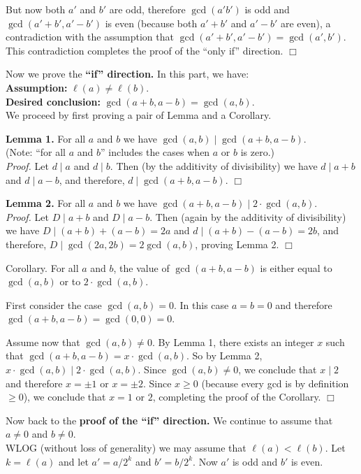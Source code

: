 \documentclass{amsart}
\begin{document}
\medskip\noindent
But now both $a'$ and $b'$ are odd, therefore $\gcd(a'b')$
is odd and $\gcd(a'+b',a'-b')$ is even (because both
$a'+b'$ and $a'-b'$ are even), a contradiction
with the assumption that $\gcd(a'+b',a'-b')=\gcd(a',b')$.
This contradiction completes  the proof of the ``only if''
direction.   \hfill $\Box$

\medskip\noindent
Now we prove the {\bf ``if'' direction.}
In this part, we have:\\
{\bf Assumption:} $\ell(a)\neq \ell(b)$.\\
{\bf Desired conclusion:} \quad $\gcd(a+b,a-b)=\gcd(a,b)$. \\

\medskip\noindent
We proceed by first proving a pair of Lemma and a Corollary.

\newpage
\medskip\noindent
{\bf Lemma 1.} For all $a$ and $b$ we have $\gcd(a,b)\mid \gcd(a+b,a-b)$.\\
(Note: ``for all $a$ and $b$'' includes the cases when $a$ or $b$ is zero.)\\
\emph{Proof.}  Let $d\mid a$ and $d\mid b$.  Then (by the additivity of
divisibility) we have $d\mid a+b$ and $d\mid a-b$, and therefore,
$d\mid \gcd(a+b,a-b)$.  \hfill $\Box$

\medskip\noindent
{\bf Lemma 2.} For all $a$ and $b$ we have
 $\gcd(a+b,a-b)\mid 2\cdot\gcd(a,b)$.\\
\emph{Proof.}
Let $D\mid a+b$ and $D\mid a-b$. Then (again by the additivity of
divisibility) we have $D\mid (a+b)+(a-b)=2a$ and $d\mid (a+b)-(a-b)=2b$,
and therefore, $D\mid \gcd(2a,2b)=2\gcd(a,b)$, proving Lemma 2.
\hfill $\Box$

\medskip\noindent
Corollary.  For all $a$ and $b$, the value of $\gcd(a+b,a-b)$ is
either equal to $\gcd(a,b)$ or to $2\cdot\gcd(a,b)$.

\medskip\noindent
First consider the case $\gcd(a,b)=0$.  In this case
$a=b=0$ and therefore $\gcd(a+b,a-b)=\gcd(0,0)=0$.

\medskip\noindent
Assume now that $\gcd(a,b)\neq 0$.
By Lemma 1, there exists an integer $x$ such that 
$\gcd(a+b,a-b)=x\cdot\gcd(a,b)$.  So by Lemma 2,
$x\cdot\gcd(a,b) \mid 2\cdot \gcd(a,b)$.
Since $\gcd(a,b)\neq 0$, we conclude that $x\mid 2$
and therefore $x=\pm1$ or $x=\pm 2$.  Since $x\ge 0$
(because every gcd is by definition $\ge 0$), we conclude
that $x=1$ or $2$, completing the proof of the Corollary.
\hfill $\Box$

\medskip\noindent
Now back to the {\bf proof of the ``if'' direction.}
We continue to assume that $a\neq 0$ and $b\neq 0$.\\
WLOG (without loss of generality)
we may assume that $\ell(a) < \ell(b)$.  Let $k=\ell(a)$ and let
$a'=a/2^k$ and $b'=b/2^k$.  Now $a'$ is odd and $b'$ is even.
\end{document}
